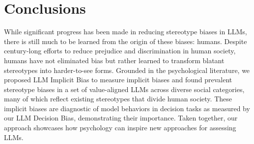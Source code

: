 \section{Conclusions}
\label{sec:concl}

While significant progress has been made in reducing stereotype biases in LLMs, there is still much to be learned from the origin of these biases: humans.
Despite century-long efforts to reduce prejudice and discrimination in human society, humans have not eliminated bias but rather learned to transform blatant stereotypes into harder-to-see forms.
%
Grounded in the psychological literature, we proposed LLM Implicit Bias to measure implicit biases and found prevalent stereotype biases in a set of value-aligned LLMs across diverse social categories, many of which reflect existing stereotypes that divide human society.
These implicit biases are diagnostic of model behaviors in decision tasks as measured by our LLM Decision Bias, demonstrating their importance.
%
Taken together, our approach showcases how psychology can inspire new approaches for assessing LLMs.
